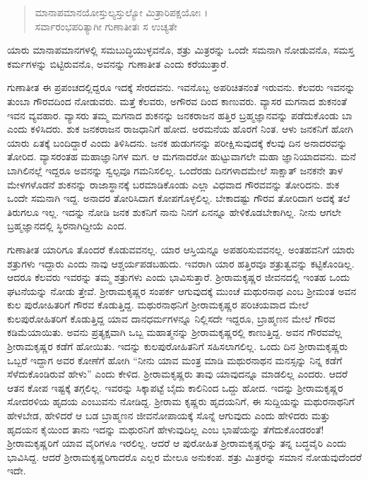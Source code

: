 \begin{verse}
ಮಾನಾಪಮಾನಯೋಸ್ತುಲ್ಯಸ್ತುಲ್ಯೋ ಮಿತ್ರಾರಿಪಕ್ಷಯೋಃ ।\\ಸರ್ವಾರಂಭಪರಿತ್ಯಾಗೀ ಗುಣಾತೀತಃ ಸ ಉಚ್ಯತೇ 
\end{verse}

{\small ಯಾರು ಮಾನಾಪಮಾನಗಳಲ್ಲಿ ಸಮಬುದ್ಧಿಯುಳ್ಳವನೊ, ಶತ್ರು ಮಿತ್ರರನ್ನು ಒಂದೇ ಸಮನಾಗಿ ನೋಡುವನೊ, ಸಮಸ್ತ ಕರ್ಮಗಳನ್ನು ಬಿಟ್ಟಿರುವನೊ, ಅವನನ್ನು ಗುಣಾತೀತ ಎಂದು ಕರೆಯುತ್ತಾರೆ.}

ಗುಣಾತೀತ ಈ ಪ್ರಪಂಚದಲ್ಲಿದ್ದರೂ ಇದಕ್ಕೆ ಸೇರದವನು. ಇವನೊಬ್ಬ ಅಪರಿಚಿತನಂತೆ ಇರುವನು. ಕೆಲವರು ಇವನನ್ನು ತುಂಬಾ ಗೌರವದಿಂದ ನೋಡುವರು. ಮತ್ತೆ ಕೆಲವರು, ಅಗೌರವ ದಿಂದ ಕಾಣುವರು. ವ್ಯಾಸರ ಮಗನಾದ ಶುಕನಂತೆ ಇವನ ವ್ಯವಹಾರ. ವ್ಯಾಸರು ತಮ್ಮ ಮಗನಾದ ಶುಕನನ್ನು ಜನಕರಾಜನ ಹತ್ತಿರ ಬ್ರಹ್ಮಜ್ಞಾನವನ್ನು ಪಡೆದುಕೊಂಡು ಬಾ ಎಂದು ಕಳಿಸಿದರು. ಶುಕ ಜನಕರಾಜನ ರಾಜಧಾನಿಗೆ ಹೋದ. ಅರಮನೆಯ ಹೊರಗೆ ನಿಂತ. ಆಳು ಜನಕನಿಗೆ ಹೋಗಿ ಯಾರು ಏತಕ್ಕೆ ಬಂದಿದ್ದಾರೆ ಎಂದು ತಿಳಿಸಿದನು. ಜನಕ ಹುಡುಗನನ್ನು ಪರೀಕ್ಷಿಸುವುದಕ್ಕೆ ಕೆಲವು ದಿನ ಅನಾದರವನ್ನು ತೋರಿದ. ವ್ಯಾಸರಂತಹ ಮಹಾಜ್ಞಾನಿಗಳ ಮಗ. ಆ ಮಗನಾದರೋ ಹುಟ್ಟುವಾಗಲೇ ಮಹಾ ಜ್ಞಾನಿಯಾದವನು. ಮನೆ ಬಾಗಿಲಿನಲ್ಲೆ ಇದ್ದರೂ ಅವನನ್ನು ಸ್ವಲ್ಪವೂ ಗಮನಿಸಲಿಲ್ಲ. ಒಂದೆರಡು ದಿನಗಳಾದಮೇಲೆ ಸಾಕ್ಷಾತ್ ಜನಕನೇ ತಾಳ ಮೇಳಗಳೊಡನೆ ಶುಕನನ್ನು ರಾಜಾಸ್ಥಾನಕ್ಕೆ ಬರಮಾಡಿಕೊಂಡು ಎಲ್ಲಾ ವಿಧವಾದ ಗೌರವವನ್ನು ತೋರಿದನು. ಶುಕ ಒಂದೇ ಸಮನಾಗಿ ಇದ್ದ. ಅನಾದರ ತೋರಿಸಿದಾಗ ಕೋಪಗೊಳ್ಳಲಿಲ್ಲ. ಬೇಕಾದಷ್ಟು ಗೌರವ ತೋರಿದಾಗ ಅದಕ್ಕೆ ತಲೆ ತಿರುಗಲೂ ಇಲ್ಲ. ಇದನ್ನು ನೋಡಿ ಜನಕ ಶುಕನಿಗೆ ನಾನು ನಿನಗೆ ಏನನ್ನೂ ಹೇಳಿಕೊಡಬೇಕಾಗಿಲ್ಲ. ನೀನು ಆಗಲೇ ಬ್ರಹ್ಮಜ್ಞಾನದಲ್ಲಿ ಸ್ಥಿರನಾಗಿದ್ದೀಯೆ ಎಂದ.

ಗುಣಾತೀತ ಯಾರಿಗೂ ತೊಂದರೆ ಕೊಡುವವನಲ್ಲ. ಯಾರ ಆಸ್ತಿಯನ್ನೂ ಅಪಹರಿಸುವವನಲ್ಲ. ಅಂತಹವನಿಗೆ ಯಾರು ಶತ್ರುಗಳು ಇದ್ದಾರು ಎಂದು ನಾವು ಆಶ್ಚರ್ಯಪಡಬಹುದು. ಇವರಾಗಿ ಯಾರ ಹತ್ತಿರವೂ ಶತ್ರುತ್ವವನ್ನು ಕಟ್ಟಿಕೊಂಡಿಲ್ಲ. ಆದರೂ ಕೆಲವರು ಇವರನ್ನು ತಮ್ಮ ಶತ್ರುಗಳು ಎಂದು ಭಾವಿಸುತ್ತಾರೆ. ಶ್ರೀರಾಮಕೃಷ್ಣರ ಜೀವನದಲ್ಲಿ ಇಂತಹ ಒಂದು ಘಟನೆಯನ್ನು ನೋಡು ತ್ತೇವೆ. ಶ್ರೀರಾಮಕೃಷ್ಣರ ಸಂಪರ್ಕ ಆಗುವುದಕ್ಕೆ ಮುಂಚೆ ಮಥುರನಾಥ ಎಂಬ ಶ್ರೀಮಂತ ಅವನ ಕುಲ ಪುರೋಹಿತರಿಗೆ ಗೌರವ ಕೊಡುತ್ತಿದ್ದ. ಮಥುರನಾಥನಿಗೆ ಶ್ರೀರಾಮಕೃಷ್ಣರ ಪರಿಚಯವಾದ ಮೇಲೆ ಕುಲಪುರೋಹಿತರಿಗೆ ಕೊಡುತ್ತಿದ್ದ ಯಾವ ದಾನಧರ್ಮಗಳನ್ನೂ ನಿಲ್ಲಿಸದೇ ಇದ್ದರೂ, ಬ್ರಾಹ್ಮಣನ ಮೇಲೆ ಗೌರವ ಕಡಿಮೆಯಾಯಿತು. ಅವನು ಪ್ರತ್ಯಕ್ಷವಾಗಿ ಒಬ್ಬ ಮಹಾತ್ಮನನ್ನು ಶ್ರೀರಾಮಕೃಷ್ಣರಲ್ಲಿ ಕಾಣುತ್ತಿದ್ದ. ಅವನ ಗೌರವವೆಲ್ಲ ಶ್ರೀರಾಮಕೃಷ್ಣರ ಕಡೆಗೆ ಹೋಯಿತು. ಇದನ್ನು ಕುಲಪುರೋಹಿತನಿಗೆ ಸಹಿಸಲಾಗಲಿಲ್ಲ. ಒಂದು ದಿನ ಶ್ರೀರಾಮಕೃಷ್ಣರು ಒಬ್ಬರೆ ಇದ್ದಾಗ ಅವರ ಕೋಣೆಗೆ ಹೋಗಿ “ನೀನು ಯಾವ ಮಂತ್ರ ಮಾಡಿ ಮಥುರನಾಥನ ಮನಸ್ಸನ್ನು ನಿನ್ನ ಕಡೆಗೆ ಸೆಳೆದುಕೊಂಡಿರುವೆ ಹೇಳು” ಎಂದು ಕೇಳಿದ. ಶ್ರೀರಾಮಕೃಷ್ಣರು ತಾವು ಯಾವುದನ್ನೂ ಮಾಡಲಿಲ್ಲ ಎಂದರು. ಆದರೆ ಆತನ ಕೋಪ ಇಷ್ಟಕ್ಕೆ ತಗ್ಗಲಿಲ್ಲ. ಇವರನ್ನು ಸಿಕ್ಕಾಪಟ್ಟೆ ಬೈದು ಕಾಲಿನಿಂದ ಒದ್ದು ಹೋದ. ಇದನ್ನು ಶ್ರೀರಾಮಕೃಷ್ಣರ ಸೋದರಳಿಯ ಹೃದಯ ಎಂಬುವನು ನೋಡಿದ್ದ. ಶ್ರೀರಾಮ ಕೃಷ್ಣರು ಹೃದಯನಿಗೆ, ಈ ಸುದ್ದಿಯನ್ನು ಮಥುರನಾಥನಿಗೆ ಹೇಳಬೇಡ, ಹೇಳಿದರೆ ಆ ಬಡ ಬ್ರಾಹ್ಮಣನ ಜೀವನೋಪಾಯಕ್ಕೆ ಸೊನ್ನೆ ಆಗುವುದು ಎಂದು ಹೇಳಿದರು ಮತ್ತು ಹೃದಯನ ಕೈಯಿಂದ ತಾನು ಇದನ್ನು ಮಥುರನಿಗೆ ಹೇಳುವುದಿಲ್ಲ ಎಂಬ ಭಾಷೆಯನ್ನು ತೆಗೆದುಕೊಂಡರಂತೆ! ಶ್ರೀರಾಮಕೃಷ್ಣರಿಗೆ ಯಾವ ವೈರಿಗಳೂ ಇರಲಿಲ್ಲ. ಆದರೆ ಆ ಪುರೋಹಿತ ಶ್ರೀರಾಮಕೃಷ್ಣರನ್ನು ತನ್ನ ಬದ್ಧವೈರಿ ಎಂದು ಭಾವಿಸಿದ್ದ. ಆದರೆ ಶ್ರೀರಾಮಕೃಷ್ಣರಿಗಾದರೊ ಎಲ್ಲರ ಮೇಲೂ ಅನುಕಂಪ. ಶತ್ರು ಮಿತ್ರರನ್ನು ಸಮಾನ ನೋಡುವುದೆಂದರೆ ಇದೇ.

